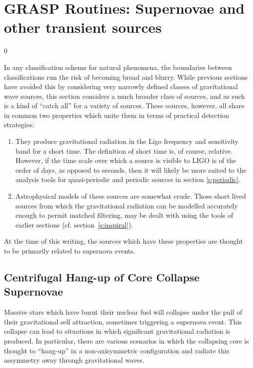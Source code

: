 \section{GRASP Routines: Supernovae and other transient sources}
\label{s:transient}
\setcounter{equation}0

In any classification scheme for natural phenomena, the boundaries between
classifications run the risk of becoming broad and blurry. While previous
sections have avoided this by considering very narrowly defined classes of
gravitational wave sources, this section considers a much broader class of
sources, and as such is a kind of ``catch all'' for a variety of sources. 
These sources, however, all share in common two properties which unite them in
terms of practical detection strategies:
\begin{enumerate}
\item They produce gravitational radiation in the Ligo frequency and
sensitivity band for a short time. The definition of short time is, of course,
relative. However, if the time scale over which a source is visible to LIGO is
of the order of days, as opposed to seconds, then it will likely be more
suited to the analysis tools for quasi-periodic and periodic sources in
section \ref{s:periodic}. 
\item Astrophysical models of these sources are somewhat crude.
Those short lived sources from which the gravitational radiation can be
modelled accurately enough to permit matched filtering, may be dealt 
with using the tools of earlier sections (cf. section~\ref{s:inspiral}).
\end{enumerate}
At the time of this writing, the sources which have these properties
are thought to be primarily related to supernova events.
\newpage

\subsection{Centrifugal Hang-up of Core Collapse Supernovae}
\label{ss:LS}

Massive stars which have burnt their nuclear fuel will collapse under the pull
of their gravitational self attraction, sometimes triggering a supernova event. 
This collapse can lead to situations in which significant gravitational 
radiation is produced.  In particular, there are various scenarios in which
the collapsing core is thought to ``hang-up'' in a non-axisymmetric 
configuration and radiate this assymmetry away through gravitational waves.

